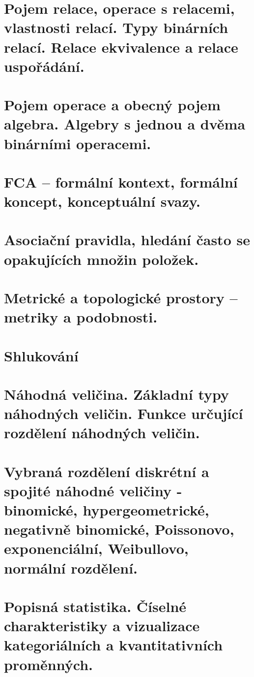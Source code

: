 \documentclass[openany]{book}
\begin{document}
\section{Pojem relace, operace s relacemi, vlastnosti relací. Typy binárních relací. Relace ekvivalence a relace uspořádání.}

\section{Pojem operace a obecný pojem algebra. Algebry s jednou a dvěma binárními operacemi.}

\section{FCA – formální kontext, formální koncept, konceptuální svazy.}

\section{Asociační pravidla, hledání často se opakujících množin položek.}

\section{Metrické a topologické prostory – metriky a podobnosti.}

\section{Shlukování}

\section{Náhodná veličina. Základní typy náhodných veličin. Funkce určující rozdělení náhodných veličin.}

\section{Vybraná rozdělení diskrétní a spojité náhodné veličiny - binomické, hypergeometrické, negativně binomické, Poissonovo, exponenciální, Weibullovo, normální rozdělení.}

\section{Popisná statistika. Číselné charakteristiky a vizualizace kategoriálních a kvantitativních proměnných.}
\end{document}
